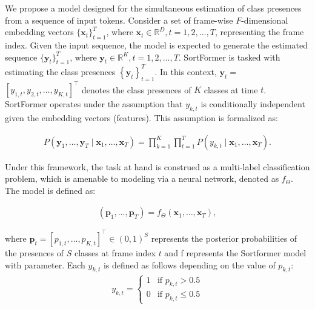 \documentclass{article}
\begin{document}


We propose a model designed for the simultaneous estimation of class presences from a sequence of input tokens.
Consider a set of frame-wise \( F \)-dimensional embedding vectors
$ \{ \mathbf{x}_t \}_{t=1}^T $, where $ \mathbf{x}_t \in \mathbb{R}^D, t = 1, 2, \ldots, T $, representing the frame index.
Given the input sequence, the model is expected to generate the estimated sequence $\{ \mathbf{y}_t \}_{t=1}^T$, where $ \mathbf{y}_t \in \mathbb{R}^K, t = 1, 2, \ldots, T $.
SortFormer is tasked with estimating the class presences \( \left\{\mathbf{y}_t\right\}_{t=1}^T \). In this context, $\mathbf{y}_t =$ {\small $\left[y_{1, t}, y_{2, t}, \ldots, y_{K, t}\right]^{\top}$}
denotes the class presences of \( K \) classes at time \( t \). SortFormer operates under the assumption that $ y_{k, t} $ is conditionally independent given the embedding vectors (features). This assumption is formalized as:

\begin{align}
  P\left(\mathbf{y}_1, \ldots, \mathbf{y}_T \mid \mathbf{x}_1, \ldots, \mathbf{x}_T\right) = \prod_{k=1}^K\prod_{t=1}^T  P\left(y_{k, t} \mid \mathbf{x}_1, \ldots, \mathbf{x}_T\right).
\end{align}

Under this framework, the task at hand is construed as a multi-label classification problem, which is amenable to modeling via a neural network, denoted as  $f_{\Theta}$. The model is defined as:

\begin{align}
  \left(\mathbf{p}_1, \ldots, \mathbf{p}_T\right) = f_{\Theta}\left(\mathbf{x}_1, \ldots, \mathbf{x}_T\right),
\end{align}

where \( \mathbf{p}_t = \left[p_{1, t}, \ldots, p_{K, t}\right]^{\top} \in (0,1)^S \) represents the posterior probabilities of the presences of \( S \) classes at frame index \( t \) and f represents
the Sortformer model with parameter.
Each \( y_{k, t} \) is defined as follows depending on the value of \( p_{k, t} \):
\begin{align}
  y_{k,t} = 
  \begin{cases} 
      1 & \text{if } p_{k,t} > 0.5 \\
      0 & \text{if } p_{k,t} \leq 0.5 
  \end{cases}
\end{align}
\end{document}
